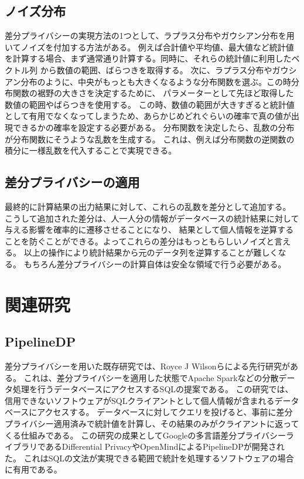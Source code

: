 \documentclass[a4paper,11pt]{jreport}
\begin{document}
\subsection{ノイズ分布}
差分プライバシーの実現方法の1つとして、ラプラス分布やガウシアン分布を用いてノイズを付加する方法がある。
例えば合計値や平均値、最大値など統計値を計算する場合、まず通常通り計算する。同時に、それらの統計値に利用したベクトル列
から数値の範囲、ばらつきを取得する。
次に、ラプラス分布やガウシアン分布のように、中央がもっとも大きくなるような分布関数を選ぶ。この時分布関数の裾野の大きさを決定するために、
パラメーターとして先ほど取得した数値の範囲やばらつきを使用する。
この時、数値の範囲が大きすぎると統計値として有用でなくなってしまうため、あらかじめどれぐらいの確率で真の値が出現できるかの確率を設定する必要がある。
分布関数を決定したら、乱数の分布が分布関数にそうような乱数を生成する。
これは、例えば分布関数の逆関数の積分に一様乱数を代入することで実現できる。\cite{rand}

\subsection{差分プライバシーの適用}
最終的に計算結果の出力結果に対して、これらの乱数を差分として追加する。
こうして追加された差分は、人一人分の情報がデータベースの統計結果に対して与える影響を確率的に遷移させることになり、
結果として個人情報を逆算することを防ぐことができる。よってこれらの差分はもっともらしいノイズと言える。
以上の操作により統計結果から元のデータ列を逆算することが難しくなる。
もちろん差分プライバシーの計算自体は安全な領域で行う必要がある。

\section{関連研究}

\subsection{PipelineDP}

差分プライバシーを用いた既存研究では、Royce J Wilsonらによる先行研究\cite{dpsql}がある。
これは、差分プライバシーを適用した状態でApache Spark\cite{apache}などの分散データ処理を行うデータベースにアクセスするSQLの提案である。
この研究では、信用できないソフトウェアがSQLクライアントとして個人情報が含まれるデータベースにアクセスする。
データベースに対してクエリを投げると、事前に差分プライバシー適用済みで統計値を計算し、その結果のみがクライアントに返ってくる仕組みである。
この研究の成果としてGoogleの多言語差分プライバシーライブラリであるDifferential Privacy\cite{googledp}やOpenMindによるPipelineDP\cite{openmind}が開発された。
これはSQLの文法が実現できる範囲で統計を処理するソフトウェアの場合に有用である。
\end{document}
